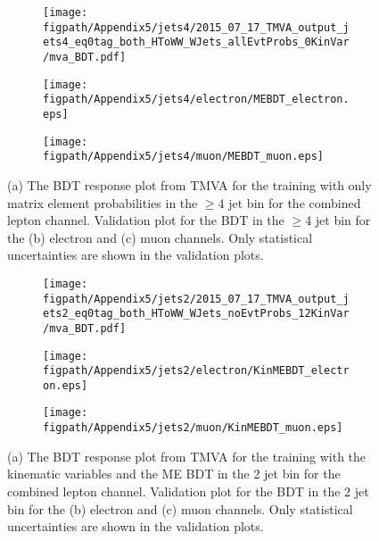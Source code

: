 \begin{figure}[!hbt]
    \centering
    \begin{subfigure}[t]{0.317\textwidth}
        \texttt{[image: \\figpath/Appendix5/jets4/2015\_07\_17\_TMVA\_output\_jets4\_eq0tag\_both\_HToWW\_WJets\_allEvtProbs\_0KinVar/mva\_BDT.pdf]}
        \caption{}
        \label{fig:MEBDT_Response_4j0B_TMVA}
    \end{subfigure}
    \begin{subfigure}[t]{0.317\textwidth}
        \texttt{[image: \\figpath/Appendix5/jets4/electron/MEBDT\_electron.eps]}
        \caption{}
        \label{fig:MEBDT_jets4_electron_noSys}
    \end{subfigure}
    \begin{subfigure}[t]{0.317\textwidth}
        \texttt{[image: \\figpath/Appendix5/jets4/muon/MEBDT\_muon.eps]}
        \caption{}
        \label{fig:MEBDT_jets4_muon_noSys}
    \end{subfigure}
    \caption{(a) The BDT response plot from TMVA for the training with only matrix element probabilities in the $\geqslant$4 jet bin for the combined lepton channel. Validation plot for the BDT in the $\geqslant$4 jet bin for the (b) electron and (c) muon channels. Only statistical uncertainties are shown in the validation plots.}
    \label{fig:MEBDT_Comparison_jets2}
\end{figure}

\begin{figure}[!hbt]
    \centering
    \begin{subfigure}[t]{0.317\textwidth}
        \texttt{[image: \\figpath/Appendix5/jets2/2015\_07\_17\_TMVA\_output\_jets2\_eq0tag\_both\_HToWW\_WJets\_noEvtProbs\_12KinVar/mva\_BDT.pdf]}
        \caption{}
        \label{fig:KinMEBDT_Response_2j0B_TMVA}
    \end{subfigure}
    \begin{subfigure}[t]{0.317\textwidth}
        \texttt{[image: \\figpath/Appendix5/jets2/electron/KinMEBDT\_electron.eps]}
        \caption{}
        \label{fig:KinMEBDT_jets2_electron_noSys}
    \end{subfigure}
    \begin{subfigure}[t]{0.317\textwidth}
        \texttt{[image: \\figpath/Appendix5/jets2/muon/KinMEBDT\_muon.eps]}
        \caption{}
        \label{fig:KinMEBDT_jets2_muon_noSys}
    \end{subfigure}
    \caption{(a) The BDT response plot from TMVA for the training with the kinematic variables and the ME BDT in the 2 jet bin for the combined lepton channel. Validation plot for the BDT in the 2 jet bin for the (b) electron and (c) muon channels. Only statistical uncertainties are shown in the validation plots.}
    \label{fig:KinMEBDT_Comparison_jets2}
\end{figure}

